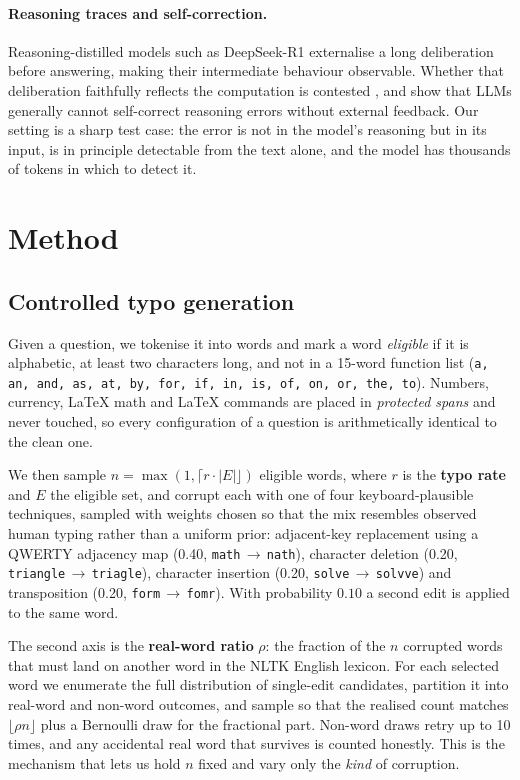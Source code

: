 \documentclass[11pt]{article}
\begin{document}
\paragraph{Reasoning traces and self-correction.}
Reasoning-distilled models such as DeepSeek-R1 \citep{deepseekr1} externalise a
long deliberation before answering, making their intermediate behaviour
observable. Whether that deliberation faithfully reflects the computation is
contested \citep{turpin2023}, and \citet{huang2024} show that LLMs generally
cannot self-correct reasoning errors without external feedback. Our setting is a
sharp test case: the error is not in the model's reasoning but in its input, is
in principle detectable from the text alone, and the model has thousands of
tokens in which to detect it.

\section{Method}
\label{sec:method}

\subsection{Controlled typo generation}
\label{sec:generator}

Given a question, we tokenise it into words and mark a word \emph{eligible} if
it is alphabetic, at least two characters long, and not in a 15-word function
list (\texttt{a, an, and, as, at, by, for, if, in, is, of, on, or, the, to}).
Numbers, currency, \LaTeX{} math and \LaTeX{} commands are placed in
\emph{protected spans} and never touched, so every configuration of a question
is arithmetically identical to the clean one.

We then sample $n=\max(1,\lceil r\cdot|E|\rfloor)$ eligible words, where $r$ is
the \textbf{typo rate} and $E$ the eligible set, and corrupt each with one of
four keyboard-plausible techniques, sampled with weights chosen so that the mix
resembles observed human typing rather than a uniform prior:
adjacent-key replacement using a QWERTY adjacency map (0.40,
\texttt{math}\,$\to$\,\texttt{nath}), character deletion (0.20,
\texttt{triangle}\,$\to$\,\texttt{triagle}), character insertion (0.20,
\texttt{solve}\,$\to$\,\texttt{solvve}) and transposition (0.20,
\texttt{form}\,$\to$\,\texttt{fomr}). With probability $0.10$ a second edit is
applied to the same word.

The second axis is the \textbf{real-word ratio} $\rho$: the fraction of the $n$
corrupted words that must land on another word in the NLTK English lexicon. For
each selected word we enumerate the full distribution of single-edit candidates,
partition it into real-word and non-word outcomes, and sample so that the
realised count matches $\lfloor \rho n\rfloor$ plus a Bernoulli draw for the
fractional part. Non-word draws retry up to 10 times, and any accidental real
word that survives is counted honestly. This is the mechanism that lets us hold
$n$ fixed and vary only the \emph{kind} of corruption.
\end{document}
